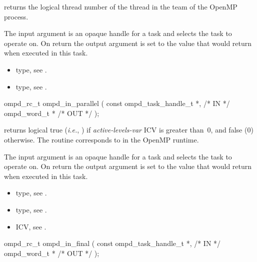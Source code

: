 \descr
{} returns the logical thread number of the thread in the team of the OpenMP process.


\argdesc
The input argument  is an opaque handle for a task and selects the task to operate on.
On return the output argument  is set to the value that  would return when
executed in this task.

\crossreferences
\begin{itemize}
	\item {} type, see .
	\item {} type, see .
\end{itemize}


\summary

\format
\cspecificstart
\begin{boxedcode}
ompd\_rc\_t ompd\_in\_parallel (
  const ompd\_task\_handle\_t  *,                           /* IN */
  ompd\_word\_t              *                                   /* OUT */
); 
\end{boxedcode}
\cspecificend

\descr
{} returns logical true (\textit{i.e.}, )
if \emph{active-levels-var}
ICV is greater than~0, and false (0) otherwise.
The routine corresponds to  in the OpenMP runtime.

\argdesc
The input argument  is an opaque handle for a task and selects the task to operate on.
On return the output argument  is set to the value that  would return when
executed in this task.

\crossreferences
\begin{itemize}
	\item {} type, see .
	\item {} type, see .
	\item {} ICV, see .
\end{itemize}


\summary

\format
\cspecificstart
\begin{boxedcode}
ompd\_rc\_t ompd\_in\_final (
  const ompd\_task\_handle\_t  *,                           /* IN */
  ompd\_word\_t              *                                   /* OUT */
); 
\end{boxedcode}
\cspecificend

